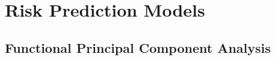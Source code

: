 
\section{Risk Prediction Models}
\label{sec:tech-risk-models}

\subsection{Functional Principal Component Analysis}
\label{sec:tech-fpca}
